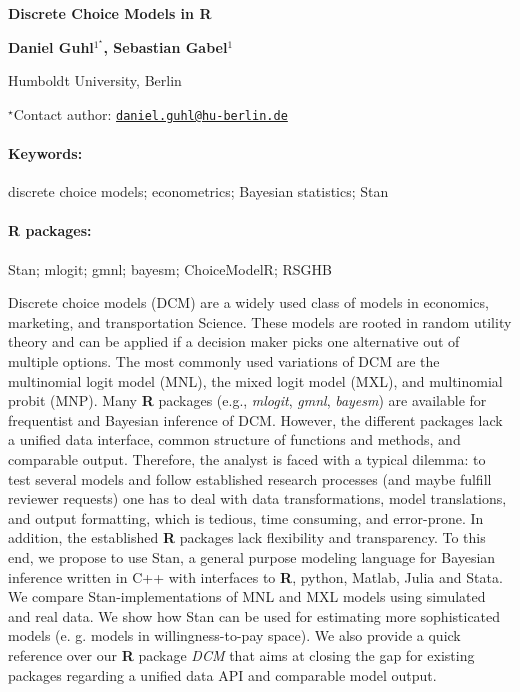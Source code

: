 \documentclass[11pt, a4paper]{article}
\renewcommand{\title}[1]{\begin{center}{\bf \LARGE #1}\end{center}}
\newcommand{\keywords}{\paragraph{Keywords:}}
\newcommand{\packages}{\paragraph{R packages:}}
\begin{document}
\pagestyle{empty}

\title{Discrete Choice Models in R}

\begin{center}
  {\bf Daniel Guhl$^{1^\star}$, Sebastian Gabel$^{1}$}
\end{center}

\vskip 0.3cm

\begin{affiliations}
\begin{enumerate}
\begin{minipage}{0.915\textwidth}
\centering
\item Humboldt University, Berlin \\[-2pt]
\end{minipage}
\end{enumerate}
$^\star$Contact author: \href{mailto:daniel.guhl@hu-berlin.de}{\nolinkurl{daniel.guhl@hu-berlin.de}}\\
\end{affiliations}

\vskip 0.5cm

\begin{minipage}{0.915\textwidth}
\keywords discrete choice models; econometrics; Bayesian statistics; Stan
\packages Stan; mlogit; gmnl; bayesm; ChoiceModelR; RSGHB
\end{minipage}

\vskip 0.8cm

Discrete choice models (DCM) are a widely used class of models in
economics, marketing, and transportation Science. These models are
rooted in random utility theory and can be applied if a decision maker
picks one alternative out of multiple options. The most commonly used
variations of DCM are the multinomial logit model (MNL), the mixed logit
model (MXL), and multinomial probit (MNP). Many \textbf{R} packages
(e.g., \emph{mlogit}, \emph{gmnl}, \emph{bayesm}) are available for
frequentist and Bayesian inference of DCM. However, the different
packages lack a unified data interface, common structure of functions
and methods, and comparable output. Therefore, the analyst is faced with
a typical dilemma: to test several models and follow established
research processes (and maybe fulfill reviewer requests) one has to deal
with data transformations, model translations, and output formatting,
which is tedious, time consuming, and error-prone. In addition, the
established \textbf{R} packages lack flexibility and transparency. To
this end, we propose to use Stan, a general purpose modeling language
for Bayesian inference written in C++ with interfaces to \textbf{R},
python, Matlab, Julia and Stata. We compare Stan-implementations of MNL
and MXL models using simulated and real data. We show how Stan can be
used for estimating more sophisticated models (e. g. models in
willingness-to-pay space). We also provide a quick reference over our
\textbf{R} package \emph{DCM} that aims at closing the gap for existing
packages regarding a unified data API and comparable model output.
\end{document}
